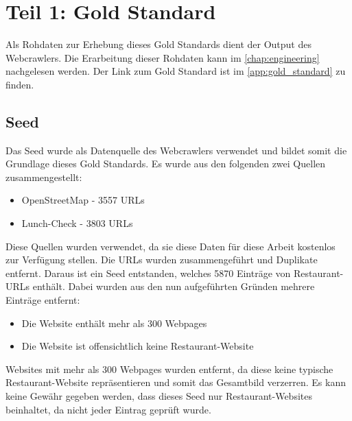 \chapter{Teil 1: Gold Standard}
Als Rohdaten zur Erhebung dieses Gold Standards dient der Output des Webcrawlers.
Die Erarbeitung dieser Rohdaten kann im \cref{chap:engineering} nachgelesen werden.
Der Link zum Gold Standard ist im \cref{app:gold_standard} zu finden.
\section{Seed}
Das Seed wurde als Datenquelle des Webcrawlers verwendet und bildet somit die Grundlage dieses Gold Standards.
Es wurde aus den folgenden zwei Quellen zusammengestellt:
\begin{itemize}
	\item OpenStreetMap - 3557 URLs
	\item Lunch-Check - 3803 URLs
\end{itemize}
Diese Quellen wurden verwendet, da sie diese Daten für diese Arbeit kostenlos zur Verfügung stellen.
Die URLs wurden zusammengeführt und Duplikate entfernt.
Daraus ist ein Seed entstanden, welches 5870 Einträge von Restaurant-URLs enthält.
Dabei wurden aus den nun aufgeführten Gründen mehrere Einträge entfernt:
\begin{itemize}
	\item Die Website enthält mehr als 300 Webpages
	\item Die Website ist offensichtlich keine Restaurant-Website
\end{itemize}
Websites mit mehr als 300 Webpages wurden entfernt, da diese keine typische Restaurant-Website repräsentieren und somit das Gesamtbild verzerren.
Es kann keine Gewähr gegeben werden, dass dieses Seed nur Restaurant-Websites beinhaltet, da nicht jeder Eintrag geprüft wurde.
